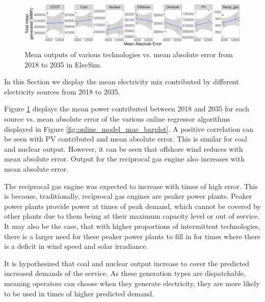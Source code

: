\documentclass[final,3p,times,twocolumn,numbers]{elsarticle}
\begin{document}
\begin{figure}[h]
\includegraphics[width=\columnwidth,natwidth=700,natheight=485]{figures/results/contributed_total_plot.pdf}
\caption{Mean outputs of various technologies vs. mean absolute error from 2018 to 2035 in ElecSim.}
\label{fig:pv_coal_nuclear_offshore_outputs}
\end{figure}


In this Section we display the mean electricity mix contributed by different electricity sources from 2018 to 2035. 

Figure \ref{fig:pv_coal_nuclear_offshore_outputs} displays the mean power contributed between 2018 and 2035 for each source vs. mean absolute error of the various online regressor algorithms displayed in Figure \ref{fig:online_model_mae_barplot}. A positive correlation can be seen with PV contributed and mean absolute error. This is similar for coal and nuclear output. However, it can be seen that offshore wind reduces with mean absolute error. Output for the reciprocal gas engine also increases with mean absolute error.

The reciprocal gas engine was expected to increase with times of high error. This is because, traditionally, reciprocal gas engines are peaker power plants. Peaker power plants provide power at times of peak demand, which cannot be covered by other plants due to them being at their maximum capacity level or out of service. It may also be the case, that with higher proportions of intermittent technologies, there is a larger need for these peaker power plants to fill in for times where there is a deficit in wind speed and solar irradiance.

It is hypothesized that coal and nuclear output increase to cover the predicted increased demands of the service. As these generation types are dispatchable, meaning operators can choose when they generate electricity, they are more likely to be used in times of higher predicted demand.


\end{document}
